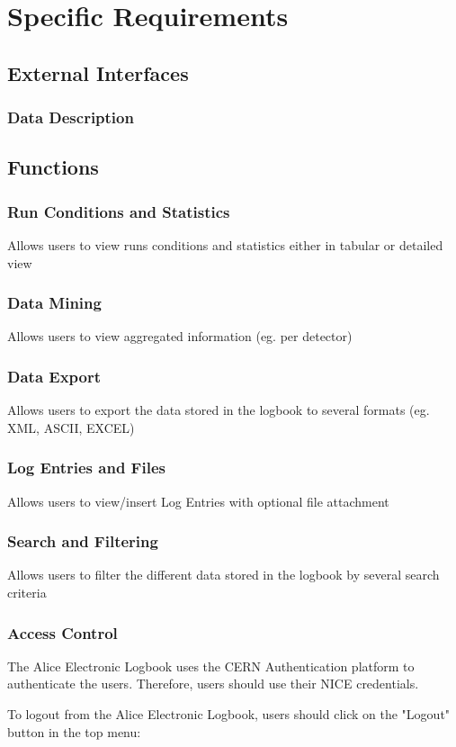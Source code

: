 
\chapter{Specific Requirements}
\section{External Interfaces}
\subsection{Data Description}
\section{Functions}
\subsection{Run Conditions and Statistics}
Allows users to view runs conditions and statistics either in tabular or detailed view
\subsection{Data Mining}
Allows users to view aggregated information (eg. per detector)
\subsection{Data Export}
Allows users to export the data stored in the logbook to several formats (eg. XML, ASCII, EXCEL)
\subsection{Log Entries and Files}
Allows users to view/insert Log Entries with optional file attachment
\subsection{Search and Filtering}
Allows users to filter the different data stored in the logbook by several search criteria
\subsection{Access Control}
The Alice Electronic Logbook uses the CERN Authentication platform to authenticate the users. Therefore, users should use their NICE credentials.

To logout from the Alice Electronic Logbook, users should click on the "Logout" button in the top menu:
